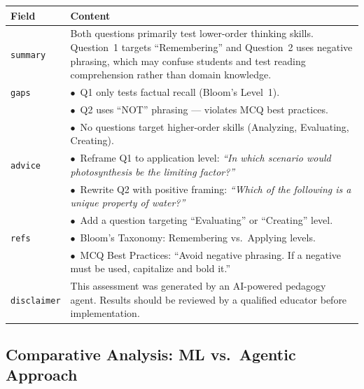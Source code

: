 \documentclass[12pt, a4paper, twoside]{article}
\begin{document}
\begin{center}
\renewcommand{\arraystretch}{1.2}
\small
\begin{tabularx}{\textwidth}{l X}
    \toprule
    \textbf{Field} & \textbf{Content} \\
    \midrule
    \texttt{summary} & Both questions primarily test lower-order
    thinking skills. Question~1 targets ``Remembering'' and Question~2
    uses negative phrasing, which may confuse students and test
    reading comprehension rather than domain knowledge. \\
    \midrule
    \texttt{gaps} &
    $\bullet$\ Q1 only tests factual recall (Bloom's Level~1).\\
    & $\bullet$\ Q2 uses ``NOT'' phrasing --- violates MCQ best
    practices.\\
    & $\bullet$\ No questions target higher-order skills
    (Analyzing, Evaluating, Creating). \\
    \midrule
    \texttt{advice} &
    $\bullet$\ Reframe Q1 to application level:
    \emph{``In which scenario would photosynthesis be the limiting
    factor?''}\\
    & $\bullet$\ Rewrite Q2 with positive framing:
    \emph{``Which of the following is a unique property of water?''}\\
    & $\bullet$\ Add a question targeting ``Evaluating'' or
    ``Creating'' level. \\
    \midrule
    \texttt{refs} &
    $\bullet$\ Bloom's Taxonomy: Remembering vs.\ Applying levels.\\
    & $\bullet$\ MCQ Best Practices: ``Avoid negative phrasing.
    If a negative must be used, capitalize and bold it.'' \\
    \midrule
    \texttt{disclaimer} & This assessment was generated by an
    AI-powered pedagogy agent. Results should be reviewed by a
    qualified educator before implementation. \\
    \bottomrule
\end{tabularx}
\end{center}

\subsection{Comparative Analysis: ML vs.\ Agentic Approach}
\end{document}
